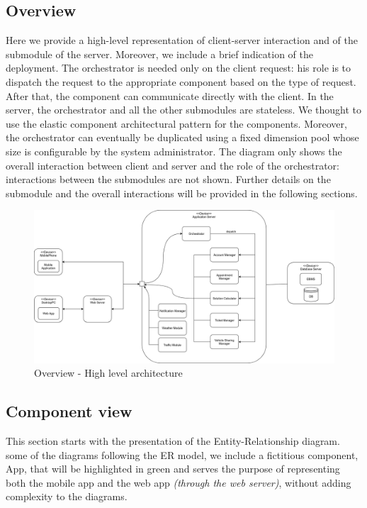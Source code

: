 \subsection{Overview}
	Here we provide a high-level representation of client-server interaction and of the submodule of the server. Moreover, we include a brief indication of the deployment.\newline
	The orchestrator is needed only on the client request: his role is to dispatch the request to the appropriate component based on the type of request. After that, the component can communicate directly with the client.\newline
	In the server, the orchestrator and all the other submodules are stateless. We thought to use the elastic component architectural pattern for the components. Moreover, the orchestrator can eventually be duplicated using a fixed dimension pool whose size is configurable by the system administrator.\newline
	The diagram only shows the overall interaction between client and server and the role of the orchestrator: interactions between the submodules are not shown. Further details on the submodule and the overall interactions will be provided in the following sections.

	\begin{figure}[H]
		\centerline{\includegraphics[width=0.9\paperwidth]{Images/Overview}}
		\caption{Overview - High level architecture}
	\end{figure}

\filbreak
\subsection{Component view}
	This section starts with the presentation of the Entity-Relationship diagram. some of the diagrams following the ER model, we include a fictitious component, App, that will be highlighted in green and serves the purpose of representing both the mobile app and the web app \textit{(through the web server)}, without adding complexity to the diagrams.
